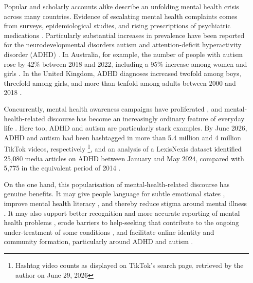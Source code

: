 Popular and scholarly accounts alike describe an unfolding mental health crisis across many countries. Evidence of escalating mental health complaints comes from surveys, epidemiological studies, and rising prescriptions of psychiatric medications \citep{haidtAnxiousGenerationHow2025}. Particularly substantial increases in prevalence have been reported for the neurodevelopmental disorders autism \citep{zeidanGlobalPrevalenceAutism2022} and attention-deficit hyperactivity disorder (ADHD) \citep{cuiDSM5ChangesCOVID192026,mckechnieAttentiondeficitHyperactivityDisorder2023}. In Australia, for example, the number of people with autism rose by 42\% between 2018 and 2022, including a 95\% increase among women and girls \citep{abs2024}. In the United Kingdom, ADHD diagnoses increased twofold among boys, threefold among girls, and more than tenfold among adults between 2000 and 2018 \citep{mckechnieAttentiondeficitHyperactivityDisorder2023}.

Concurrently, mental health awareness campaigns have proliferated \citep{bolinskiEffectEmentalHealth2020,sampognaImpactSocialMarketing2017}, and mental-health-related discourse has become an increasingly ordinary feature of everyday life \citep{foulkesAreMentalHealth2023,page18HowHarnessPower}. Here too, ADHD and autism are particularly stark examples. By June 2026, ADHD and autism had been hashtagged in more than 5.4 million and 4 million TikTok videos, respectively \footnote{Hashtag video counts as displayed on TikTok's search page, retrieved by the author on June 29, 2026}, and an analysis of a LexisNexis dataset identified 25,080 media articles on ADHD between January and May 2024, compared with 5,775 in the equivalent period of 2014 \citep{martinChangingPrevalenceADHD2025}.

On the one hand, this popularisation of mental-health-related discourse has genuine benefits. It may give people language for subtle emotional states \citep{page18HowHarnessPower}, improve mental health literacy \citep{schomerusEvolutionPublicAttitudes2012}, and thereby reduce stigma around mental illness \citep{sampognaImpactSocialMarketing2017,flearyRelationshipHealthLiteracy2022}. It may also support better recognition and more accurate reporting of mental health problems \citep{foulkesAreMentalHealth2023}, erode barriers to help-seeking that contribute to the ongoing under-treatment of some conditions \citep{haslamConceptCreepCalibration2026}, and facilitate online identity and community formation, particularly around ADHD and autism \citep{ginappExperiencesAdultsADHD2023}.

